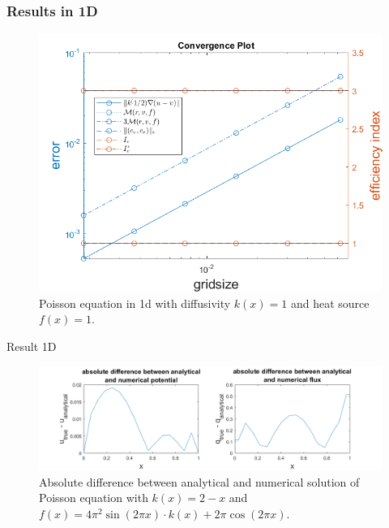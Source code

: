 \documentclass[t]{beamer}
\begin{document}
\begin{frame}
\frametitle{Results in 1D }
\vspace{-18pt}
\begin{figure}[t]
\includegraphics[width = 0.7\linewidth]{convergenceplot_k_f_constant.png}
\caption{Poisson equation in 1d with diffusivity $k(x) = 1$ and heat source $f(x) = 1$.}
\label{fig:Convergence1d1}
\end{figure}
\end{frame}

\begin{frame}{Result 1D}
\begin{figure}
\centering
\includegraphics[width = 1.05\linewidth, left]{difference_analytical_numerical.png}
\caption{Absolute difference between analytical and numerical solution of Poisson equation with $k(x) = 2-x$ and $f(x) = 4\pi^2\sin(2\pi x)\cdot k(x) + 2\pi\cos(2\pi x)$.}
\label{fig:fig:diff}
\end{figure}
\end{frame}
\end{document}
